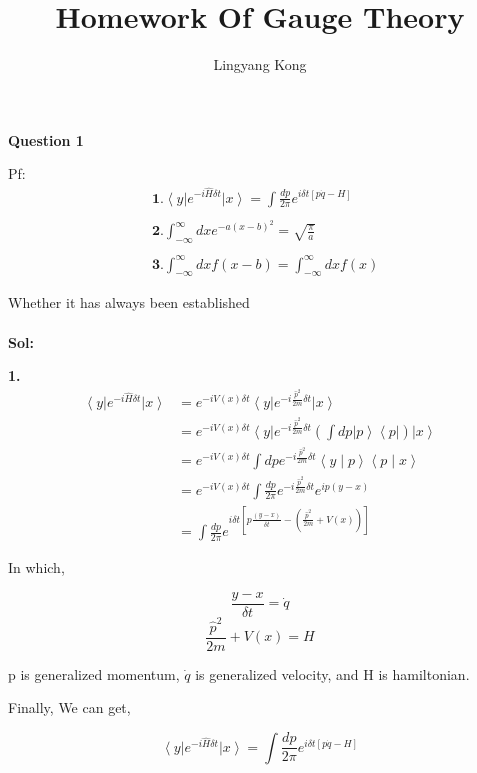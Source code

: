 \documentclass[a4paper]{article}
\title{\textbf{Homework Of Gauge Theory}}
\author{Lingyang Kong}
\date{}
\begin{document}
\maketitle

\noindent \textbf{Question 1}
\par Pf:
\begin{align}
    &\textbf{1.}\left< y \right|e^{-i\hat{H}\delta t}\left| x \right> =\int{\frac{dp}{2\pi}e^{i\delta t[p\dot{q}-H]}}\\\nonumber
    \\ 
    &\textbf{2.}\int_{-\infty}^{\infty}{dxe^{-a(x-b)^2}}
    =\sqrt{\frac{\pi}{a}}\\\nonumber
    \\ 
    &\textbf{3.}\int_{-\infty}^{\infty}{dxf(x-b)}
    =\int_{-\infty}^{\infty}{dxf(x)}
\end{align}
\par
Whether it has always been established
\\ \\
\textbf{Sol:}
\par\textbf{1.}
\begin{equation}
    \begin{split}
       \left< y \right|e^{-i\hat{H}\delta t}\left| x \right> 
       &=e^{-iV(x)\delta t}\left<y\right|e^{-i\frac{\hat{p}^2}{2m}\delta t}\left| x \right> \\
       &=e^{-iV(x)\delta t}\left<y\right|e^{-i\frac{\hat{p}^2}{2m}\delta t}(\int{dp\left|p\right>\left<p\right|})\left| x \right> \\
       &=e^{-iV(x)\delta t}\int{dp e^{-i\frac{\hat{p}^2}{2m}\delta t}\left< y \mid p \right> \left< p \mid x \right>}\\
       &=e^{-iV(x)\delta t}\int{\frac{dp}{2\pi}e^{-i\frac{\hat{p}^2}{2m}\delta t}e^{ip(y-x)}}\\
       &=\int{\frac{dp}{2\pi}e^{i\delta t[p\frac{(y-x)}{\delta t}-(\frac{\hat{p}^2}{2m}+V(x))]}}
    \end{split}
\end{equation}
\par In which,
\par 
\begin{equation}
    \frac{y-x}{\delta t}=\dot{q}
\end{equation}
\begin{equation}
    \frac{\hat{p}^2}{2m}+V(x)=H
\end{equation}
\par p is generalized momentum, $\dot{q}$ is generalized velocity, and H is hamiltonian.
\par Finally, We can get,
\par \begin{equation}
     \left< y \right|e^{-i\hat{H}\delta t}\left| x \right> =\int{\frac{dp}{2\pi}e^{i\delta t[p\dot{q}-H]}}
\end{equation}
\end{document}
